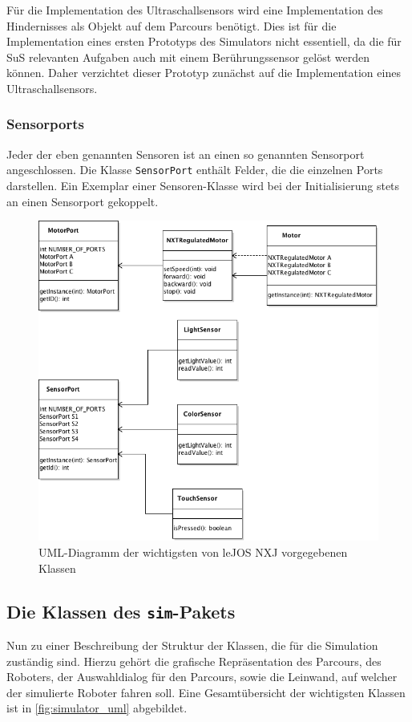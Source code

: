 \documentclass[paper=a4, DIV=calc, BCOR=15mm, twoside=on, onecolumn=on, open = right, titlepage =on, parskip =half, headsepline = on, footsepline = on, chapterprefix = off, appendixprefix = off, fontsize = 12pt, numbers = noenddot, abstract = on]{scrbook}
\begin{document}
Für die Implementation des Ultraschallsensors wird eine Implementation des Hindernisses als Objekt auf dem Parcours benötigt. Dies ist für die Implementation eines ersten Prototyps des Simulators nicht essentiell, da die für SuS relevanten Aufgaben auch mit einem Berührungssensor gelöst werden können. Daher verzichtet dieser Prototyp zunächst auf die Implementation eines Ultraschallsensors.

\subsubsection{Sensorports}
Jeder der eben genannten Sensoren ist an einen so genannten Sensorport angeschlossen. Die Klasse \texttt{SensorPort} enthält Felder, die die einzelnen Ports darstellen. Ein Exemplar einer Sensoren-Klasse wird bei der Initialisierung stets an einen Sensorport gekoppelt. 

\begin{figure}[htpb]
\centering
\includegraphics[scale=0.6]{images/uml_api_essenz.png}
\caption{UML-Diagramm der wichtigsten von leJOS NXJ vorgegebenen Klassen}
\label{fig:api_uml}
\end{figure}

\par \singlespacing
\subsection{Die Klassen des \texttt{sim}-Pakets}
\onehalfspacing
Nun zu einer Beschreibung der Struktur der Klassen, die für die Simulation zuständig sind. Hierzu gehört die grafische Repräsentation des Parcours, des Roboters, der Auswahldialog für den Parcours, sowie die Leinwand, auf welcher der simulierte Roboter fahren soll. Eine Gesamtübersicht der wichtigsten Klassen ist in \ref{fig:simulator_uml} abgebildet.
\end{document}
